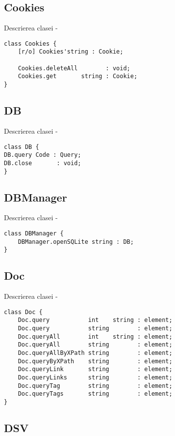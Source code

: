 \subsection{{\color{orange} Cookies}}

\noindent Descrierea clasei  -
\begin{lstlisting}[numbers=none]
class Cookies {
	[r/o] Cookies'string : Cookie;

	Cookies.deleteAll        : void;
	Cookies.get       string : Cookie;
}
\end{lstlisting}

\subsection{{\color{orange} DB}}

\noindent Descrierea clasei  -
\begin{lstlisting}[numbers=none]
class DB {
DB.query Code : Query;
DB.close       : void;
}
\end{lstlisting}

\subsection{{\color{orange} DBManager}}

\noindent Descrierea clasei  -
\begin{lstlisting}[numbers=none]
class DBManager {
	DBManager.openSQLite string : DB;
}
\end{lstlisting}

\subsection{{\color{orange} Doc}}

\noindent Descrierea clasei  -
\begin{lstlisting}[numbers=none]
class Doc {
	Doc.query           int    string : element;
	Doc.query           string        : element;
	Doc.queryAll        int    string : element;
	Doc.queryAll        string        : element;
	Doc.queryAllByXPath string        : element;
	Doc.queryByXPath    string        : element;
	Doc.queryLink       string        : element;
	Doc.queryLinks      string        : element;
	Doc.queryTag        string        : element;
	Doc.queryTags       string        : element;
}
\end{lstlisting}

\subsection{{\color{orange} DSV}}

